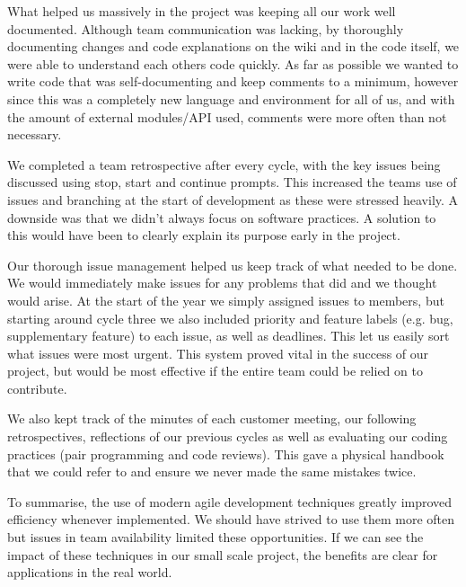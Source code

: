 \documentclass{l3proj}
\begin{document}
What helped us massively in the project was keeping all our work well documented. Although team communication was lacking, by thoroughly documenting changes and code explanations on the wiki and in the code itself, we were able to understand each others code quickly. As far as possible we wanted to write code that was self-documenting and keep comments to a minimum, however since this was a completely new language and environment for all of us, and with the amount of external modules/API used, comments were more often than not necessary.

We completed a team retrospective after every cycle, with the key issues being discussed using stop, start and continue prompts. This increased the teams use of issues and branching at the start of development as these were stressed heavily. A downside was that we didn't always focus on software practices. A solution to this would have been to clearly explain its purpose early in the project.

Our thorough issue management helped us keep track of what needed to be done. We would immediately make issues for any problems that did and we thought would arise. At the start of the year we simply assigned issues to members, but starting around cycle three we also included priority and feature labels (e.g. bug, supplementary feature) to each issue, as well as deadlines. This let us easily sort what issues were most urgent. This system proved vital in the success of our project, but would be most effective if the entire team could be relied on to contribute.

We also kept track of the minutes of each customer meeting, our following retrospectives, reflections of our previous cycles as well as evaluating our coding practices (pair programming and code reviews). This gave a physical handbook that we could refer to and ensure we never made the same mistakes twice. 

To summarise, the use of modern agile development techniques greatly improved efficiency whenever implemented. We should have strived to use them more often but issues in team availability limited these opportunities. If we can see the impact of these techniques in our small scale project, the benefits are clear for applications in the real world.


\newpage


\end{document}
